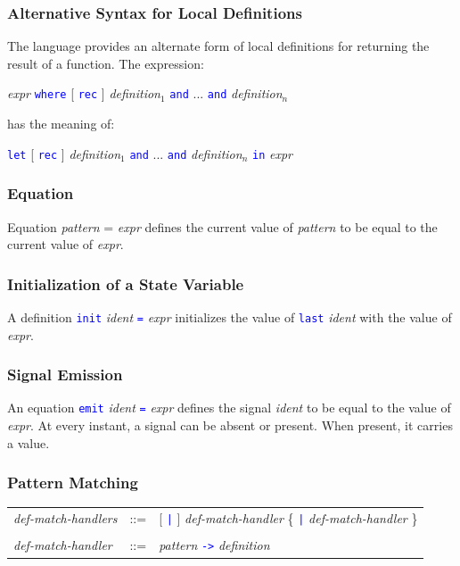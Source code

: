 \documentclass[11pt,titlepage,twoside]{report}
\newcommand{\Let}{\mbox{{\tt let}}}
\newcommand{\Rec}{\mbox{{\tt rec}}}
\newcommand{\In}{\mbox{{\tt in}}}
\newcommand{\AND}{\mbox{{\tt and}}}
\newcommand{\Emit}{\mbox{{\tt emit}}}
\newcommand{\Last}{\mbox{{\tt last}}}
\newcommand{\Minusgreater}{\mbox{{\tt ->}}}
\newcommand{\Where}{\mbox{{\tt where}}}
\newcommand{\term}[1]{\textcolor{Blue}{\tt #1}}
\newcommand{\nterm}[1]{\textcolor{BrickRed}{\it #1}}
\newcommand{\term}[1]{{\tt #1}}
\newcommand{\nterm}[1]{{\em #1}}
\begin{document}
\subsubsection{Alternative Syntax for Local Definitions}

The language provides an alternate form of local definitions for returning
the result of a function. The expression:
\begin{center}
\nterm{expr} \term{\Where} [ \term{\Rec} ]
  \nterm{definition}$_1$ \term{\AND} ... \term{\AND} \nterm{definition}$_n$ 
\end{center}
has the meaning of:
\begin{center}
  \term{\Let} [ \term{\Rec} ] 
  \nterm{definition}$_1$ \term{\AND} ... \term{\AND} \nterm{definition}$_n$
  \term{\In} \nterm{expr}
\end{center}

\subsubsection{Equation}

Equation \nterm{pattern} = \nterm{expr} defines the current
value of \nterm{pattern} to be equal to the current value of \nterm{expr}.

\subsubsection{Initialization of a State Variable}

A definition \term{init} \nterm{ident} \term{=} \nterm{expr} initializes
the value of \term{\Last} \nterm{ident} with the
value of \nterm{expr}.

\subsubsection{Signal Emission}

An equation \term{\Emit} \nterm{ident} \term{=} \nterm{expr} defines
the signal \nterm{ident} to be equal to the value of \nterm{expr}. At
every instant, a signal can be absent or present. When present, it carries
a value.

\subsubsection{Pattern Matching}

\begin{center}
\begin{tabular}{lcl}
\nterm{def-match-handlers}
   & ::=        & [ \term{|} ] \nterm{def-match-handler}
                  \{ \term{|} \nterm{def-match-handler} \} 
\\ \\
\nterm{def-match-handler}
   & ::=        & \nterm{pattern} \term{\Minusgreater} \nterm{definition}
\end{tabular}
\end{center}
\end{document}
